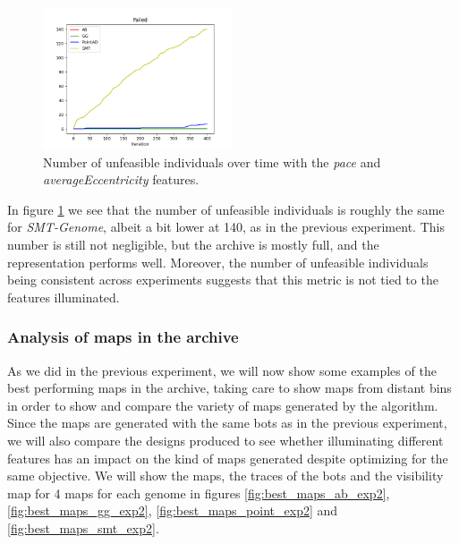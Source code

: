 \begin{figure}[H]
    \centering
    \includegraphics[width=0.5\textwidth]{images/Exp2/failed.png}
    \caption{Number of unfeasible individuals over time with the \textit{pace} and \textit{averageEccentricity} features.}
    \label{fig:failed_exp2}
\end{figure}

In figure \ref{fig:failed_exp2} we see that the number of unfeasible individuals is roughly the same for \textit{SMT-Genome}, albeit a bit lower at 140, as in the previous experiment. This number is still not negligible, but the archive is mostly full, and the representation performs well. Moreover, the number of unfeasible individuals being consistent across experiments suggests that this metric is not tied to the features illuminated.

\subsubsection*{Analysis of maps in the archive}
As we did in the previous experiment, we will now show some examples of the best performing maps in the archive, taking care to show maps from distant bins in order to show and compare the variety of maps generated by the algorithm. Since the maps are generated with the same bots as in the previous experiment, we will also compare the designs produced to see whether illuminating different features has an impact on the kind of maps generated despite optimizing for the same objective. We will show the maps, the traces of the bots and the visibility map for 4 maps for each genome in figures \cref{fig:best_maps_ab_exp2}, \cref{fig:best_maps_gg_exp2}, \cref{fig:best_maps_point_exp2} and \cref{fig:best_maps_smt_exp2}.

